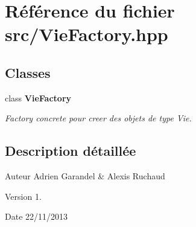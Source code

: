 \section{Référence du fichier src/\-Vie\-Factory.hpp}
\label{_vie_factory_8hpp}
\subsection*{Classes}
\begin{DoxyCompactItemize}
\item 
class {\bf Vie\-Factory}
\begin{DoxyCompactList}\small\item\em Factory concrete pour creer des objets de type Vie. \end{DoxyCompactList}\end{DoxyCompactItemize}


\subsection{Description détaillée}
\begin{DoxyAuthor}{Auteur}
Adrien Garandel \& Alexis Ruchaud 
\end{DoxyAuthor}
\begin{DoxyVersion}{Version}
1. 
\end{DoxyVersion}
\begin{DoxyDate}{Date}
22/11/2013 
\end{DoxyDate}

